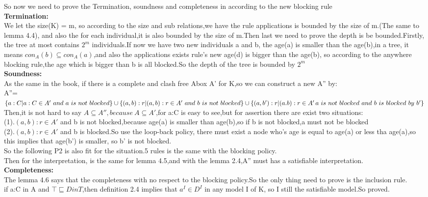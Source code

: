 \documentclass{article}
\begin{document}
    So now we need to prove the Termination, soundness and completeness in according to the new blocking rule\\
    \textbf{Termination:}\\
    We let the size(K) = m, so according to the size and sub relations,we have the rule applications is bounded by the size of m.(The same to lemma 4.4),
    and also the for each individual,it is also bounded by the size of m.Then last we need to prove the depth is be bounded.Firstly, the tree at most contains $2^m$ individuals.If now we have 
    two new individuals a and b, the age(a) is smaller than the age(b),in a tree, it means $con_A(b) \subseteq con_A(a)$,and also the applications exists rule's new age(d) is bigger than the age(b),
    so according to the anywhere blocking rule,the age which is bigger than b is all blocked.So the depth of the tree is bounded by $2^m$\\
    \textbf{Soundness:}\\
    As the same in the book, if there is a complete and clash free Abox A' for K,so we can construct a new A'' by:\\
    A''=$\{a:C|a:C \in A'\ and\ a\ is\ not\ blocked\}\cup\\
    \{(a,b):r|(a,b):r\in A'\ and\ b\ is\ not\ blocked\}\cup\\
    \{(a,b'):r|(a.b):r\in A'\,a\ is\ not\ blocked\ and\ b\ is\ blocked\ by\ b' \}$\\
    Then,it is not hard to say $A\subseteq A'',because\ A\subseteq A'$,for a:C is easy to see,but for assertion there are exist two situations:\\
    (1).$(a,b):r\in A'$ and b is not blocked,because age(a) is smaller than age(b),so if b is not blocked,a must not be blocked\\
    (2).$(a,b):r\in A'$ and b is blocked.So use the loop-back policy, there must exist a node who's age is equal to age(a) or less tha  age(a),so this implies that age(b') is smaller,
    so b' is not blocked.\\
    So the following P2 is also fit for the situation.5 rules is the same with the blocking policy.\\
    Then for the interpretation, is the same for lemma 4.5,and with the lemma 2.4,A'' must has a satisfiable interpretation.\\
    \textbf{Completeness:}\\
    The lemma 4.6 says that the completeness with no respect to the blocking policy.So the only thing need to prove is the inclusion rule.\\
    if a:C in A and $\top \sqsubseteq D in T$,then definition 2.4 implies that $a^I \in D^I$ in any model I of K, so I still the satisfiable model.So proved.\\
\end{document}
